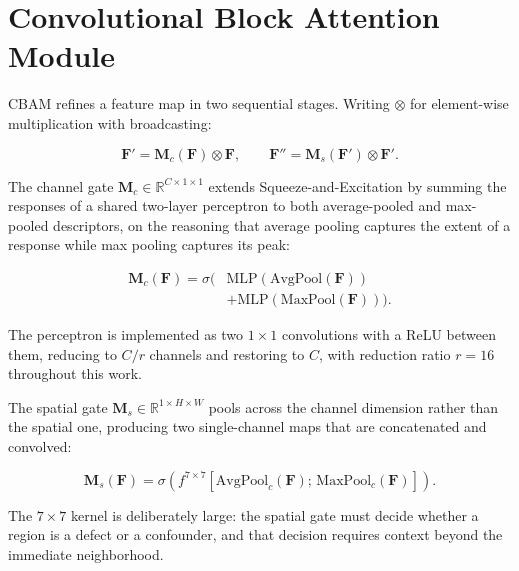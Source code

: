 \documentclass[MScCS]{uccthesis}
\begin{document}
\section{Convolutional Block Attention Module}
\label{sec:cbam}

CBAM \parencite{woo2018cbam} refines a feature map in two sequential stages.
Writing $\otimes$ for element-wise multiplication with broadcasting:

\begin{equation}
   \mathbf{F}' = \mathbf{M}_c(\mathbf{F}) \otimes \mathbf{F},
   \qquad
   \mathbf{F}'' = \mathbf{M}_s(\mathbf{F}') \otimes \mathbf{F}' .
   \label{eq:cbam_seq}
\end{equation}

The channel gate $\mathbf{M}_c \in \mathbb{R}^{C \times 1 \times 1}$ extends
Squeeze-and-Excitation by summing the responses of a shared two-layer
perceptron to both average-pooled and max-pooled descriptors, on the reasoning
that average pooling captures the extent of a response while max pooling
captures its peak:

\begin{equation}
\begin{split}
   \mathbf{M}_c(\mathbf{F}) = \sigma\bigl(&
      \mathrm{MLP}(\mathrm{AvgPool}(\mathbf{F})) \\
      &+ \mathrm{MLP}(\mathrm{MaxPool}(\mathbf{F})) \bigr).
\end{split}
\label{eq:cbam_channel}
\end{equation}

The perceptron is implemented as two $1 \times 1$ convolutions with a
ReLU between them, reducing to $C/r$ channels and restoring to $C$, with
reduction ratio $r = 16$ throughout this work.

The spatial gate $\mathbf{M}_s \in \mathbb{R}^{1 \times H \times W}$ pools
across the channel dimension rather than the spatial one, producing two
single-channel maps that are concatenated and convolved:

\begin{equation}
   \mathbf{M}_s(\mathbf{F}) = \sigma\!\left(
      f^{7 \times 7}\!\left[
         \mathrm{AvgPool}_{c}(\mathbf{F}); \,
         \mathrm{MaxPool}_{c}(\mathbf{F})
      \right] \right).
   \label{eq:cbam_spatial}
\end{equation}

The $7 \times 7$ kernel is deliberately large: the spatial gate must decide
whether a region is a defect or a confounder, and that decision requires
context beyond the immediate neighborhood.
\end{document}
